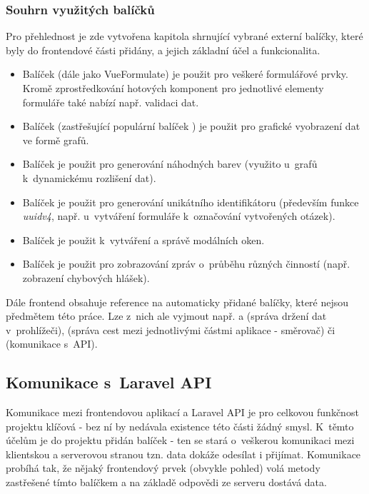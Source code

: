 		\subsubsection{Souhrn využitých balíčků}\label{sec:fe_packages}
		Pro přehlednost je zde vytvořena kapitola shrnující vybrané externí balíčky, které byly do frontendové části přidány, a jejich základní účel a funkcionalita.
		
		\begin{itemize}
			\item Balíček  (dále jako VueFormulate) je použit pro veškeré formulářové prvky. Kromě zprostředkování hotových komponent pro jednotlivé elementy formuláře také nabízí např. validaci dat.
			\item Balíček  (zastřešující populární balíček ) je použit pro grafické vyobrazení dat ve formě grafů.
			\item Balíček  je použit pro generování náhodných barev (využito u~grafů k~dynamickému rozlišení dat).
			\item Balíček  je použit pro generování unikátního identifikátoru (především funkce \textit{uuidv4}, např. u~vytváření formuláře k~označování vytvořených otázek).
			\item Balíček  je použit k~vytváření a správě modálních oken.
			\item Balíček  je použit pro zobrazování zpráv o~průběhu různých činností (např. zobrazení chybových hlášek).
		\end{itemize}
	
		Dále frontend obsahuje reference na automaticky přidané balíčky, které nejsou předmětem této práce. Lze z~nich ale vyjmout např.  a  (správa držení dat v~prohlížeči),  (správa cest mezi jednotlivými částmi aplikace - směrovač) či  (komunikace s~API).
	
	\subsection{Komunikace s~Laravel API}\label{sec:komunikace_s_api}
	Komunikace mezi frontendovou aplikací a Laravel API je pro celkovou funkčnost projektu klíčová - bez ní by nedávala existence této části žádný smysl. K~těmto účelům je do projektu přidán balíček  - ten se stará o~veškerou komunikaci mezi klientskou a serverovou stranou tzn. data dokáže odesílat i přijímat. Komunikace probíhá tak, že nějaký frontendový prvek (obvykle pohled) volá metody zastřešené tímto balíčkem a na základě odpovědi ze serveru dostává data.
	
